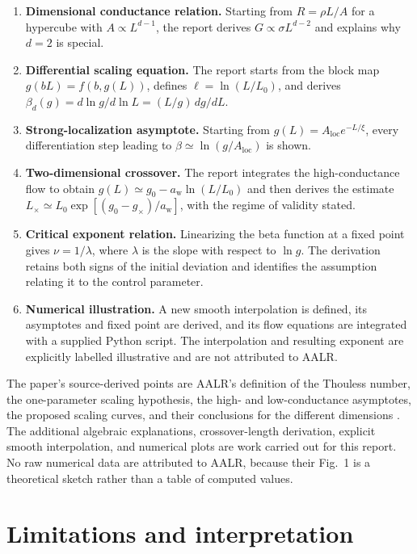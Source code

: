 \documentclass[11pt,a4paper]{article}
\numberwithin{equation}{section}
\begin{document}
\begin{enumerate}[label=\arabic*.]
    \item \textbf{Dimensional conductance relation.} Starting from $R=\rho L/A$ for a hypercube with $A\propto L^{d-1}$, the report derives $G\propto\sigma L^{d-2}$ and explains why $d=2$ is special.
    \item \textbf{Differential scaling equation.} The report starts from the block map $g(bL)=f(b,g(L))$, defines $\ell=\ln(L/L_0)$, and derives $\beta_d(g)=d\ln g/d\ln L=(L/g)\,dg/dL$.
    \item \textbf{Strong-localization asymptote.} Starting from $g(L)=A_{\mathrm{loc}}e^{-L/\xi}$, every differentiation step leading to $\beta\simeq\ln(g/A_{\mathrm{loc}})$ is shown.
    \item \textbf{Two-dimensional crossover.} The report integrates the high-conductance flow to obtain $g(L)\simeq g_0-a_{\mathrm{w}}\ln(L/L_0)$ and then derives the estimate $L_\times\simeq L_0\exp[(g_0-g_\times)/a_{\mathrm{w}}]$, with the regime of validity stated.
    \item \textbf{Critical exponent relation.} Linearizing the beta function at a fixed point gives $\nu=1/\lambda$, where $\lambda$ is the slope with respect to $\ln g$. The derivation retains both signs of the initial deviation and identifies the assumption relating it to the control parameter.
    \item \textbf{Numerical illustration.} A new smooth interpolation is defined, its asymptotes and fixed point are derived, and its flow equations are integrated with a supplied Python script. The interpolation and resulting exponent are explicitly labelled illustrative and are not attributed to AALR.
\end{enumerate}

The paper's source-derived points are AALR's definition of the Thouless number, the one-parameter scaling hypothesis, the high- and low-conductance asymptotes, the proposed scaling curves, and their conclusions for the different dimensions \cite{AALR1979}. The additional algebraic explanations, crossover-length derivation, explicit smooth interpolation, and numerical plots are work carried out for this report. No raw numerical data are attributed to AALR, because their Fig.~1 is a theoretical sketch rather than a table of computed values.

\section{Limitations and interpretation}
\end{document}
